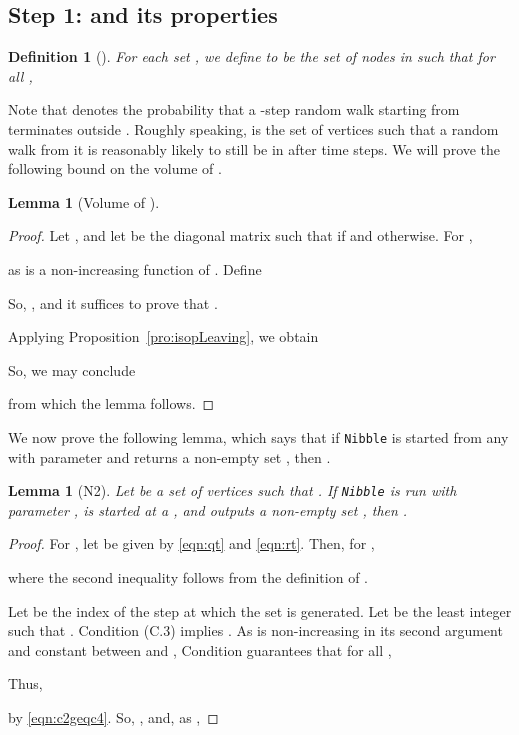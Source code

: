 \documentclass[11pt]{article}
\newtheorem{lemma}[theorem]{Lemma}
\newtheorem{definition}[theorem]{Definition}
\begin{document}
\subsection*{Step 1:  and its properties}



\begin{definition}[]\label{def:sg}
For each set , we define
   to be the set of nodes  in  such that
  for all ,

\end{definition}

Note that 
  denotes the probability that a -step random walk
  starting from  terminates outside .
Roughly speaking,  is the set of vertices 
  such that a random walk from 
  it is reasonably likely to still be in  after 
  time steps.
We will prove the following bound on the volume of .
\begin{lemma}[Volume of ]\label{lem:sizeSg}

\end{lemma}
\begin{proof}
Let , and let  be the diagonal matrix such that
   if  and  otherwise.
For ,

as 
  is a non-increasing function of .
Define

So, , and it
  suffices to prove that
  .

Applying Proposition~\ref{pro:isopLeaving}, we obtain

So, we may conclude

from which the lemma follows.
\end{proof}


We now prove the following lemma,  which says  that
  if \texttt{Nibble} is started from any
   with parameter  and returns a non-empty set ,
  then  .

\begin{lemma}[N2]\label{lem:N3}
Let  be a set of vertices such that
  .
If \texttt{Nibble} is run with parameter ,
  is started at a ,
  and outputs a non-empty set , then
  .
\end{lemma}
\begin{proof}
For , let  be given by \eqref{eqn:qt} and \eqref{eqn:rt}.
Then, for ,

where the second inequality follows from the definition of .


Let  be the index of the step at which the set  is generated.
Let  be the least integer such that
  .
Condition (C.3) implies .
As  is non-increasing in its second argument and
  constant between  and  ,
  Condition  guarantees that for all
  ,

Thus,

by \eqref{eqn:c2geqc4}.
So, ,
 and, as ,

\end{proof}
\end{document}

